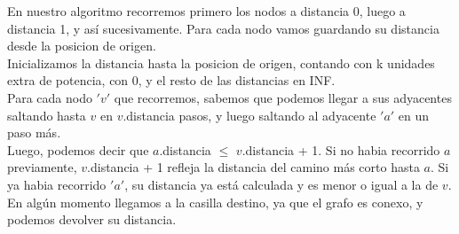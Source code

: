 \documentclass[11pt, a4paper, twoside]{article}
\begin{document}
{}
En nuestro algoritmo recorremos primero los nodos a distancia 0, luego a distancia 1, y así sucesivamente.
Para cada nodo vamos guardando su distancia desde la posicion de origen. \\
Inicializamos la distancia hasta la posicion de origen, contando con k unidades extra de potencia, con 0, y el 
resto de las distancias en INF.\\
Para cada nodo $'v'$ que recorremos, sabemos que podemos llegar a sus adyacentes saltando hasta $v$ en $v$.distancia 
pasos, y luego saltando al adyacente $'a'$ en un paso más. \\
Luego, podemos decir que $a$.distancia $\le$ $v$.distancia + 1. Si no habia recorrido $a$ previamente, 
$v$.distancia + 1 refleja la distancia del camino más corto hasta $a$. Si ya habia recorrido $'a'$, su 
distancia ya está calculada y es menor o igual a la de $v$. En algún momento llegamos a la casilla destino, 
ya que el grafo es conexo, y podemos devolver su distancia. \\
\end{document}
